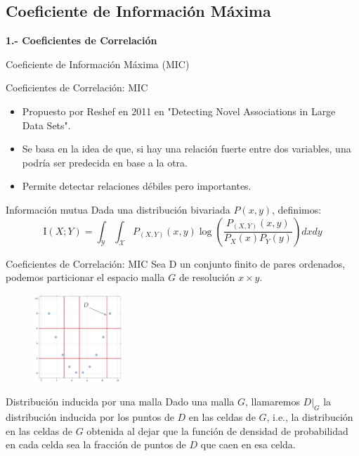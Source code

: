 \documentclass{beamer}
\begin{document}
\subsection{Coeficiente de Información Máxima}
\begin{frame}
    \begin{center}
        {\LARGE\bf 1.- Coeficientes de Correlación}
        \pause

        {\Large  Coeficiente de Información Máxima (MIC)}
    \end{center}
\end{frame}




\begin{frame}{Coeficientes de Correlación: MIC}
    \begin{itemize}
        \item Propuesto por Reshef en 2011 en "Detecting Novel Associations in Large Data Sets".
        \pause
        \item Se basa en la idea de que, si hay una relación fuerte entre dos variables, una podría ser predecida en base a la otra.
        \pause
        \item Permite detectar relaciones débiles pero importantes.
    \end{itemize}
    \pause
    \begin{block}{Información mutua}
    Dada una distribución bivariada $P(x,y)$, definimos:
        \begin{equation*}
            \mathrm{I}(X ; Y)=\int_{\mathcal{Y}} \int_{\mathcal{X}} P_{(X, Y)}(x, y) \log \left(\frac{P_{(X, Y)}(x, y)}{P_{X}(x) P_{Y}(y)}\right)dxdy
        \end{equation*}
    \end{block}
\end{frame}

\begin{frame}{Coeficientes de Correlación: MIC}
    Sea D un conjunto finito de pares ordenados, podemos particionar el espacio malla $G$ de resolución $x \times y$.
    \begin{figure}[H]
        \centering
        \includegraphics[width=0.3\textwidth]{mallaG4x3.png}
    \end{figure}
    \pause
    \begin{block}{Distribución inducida por una malla}
        Dado una malla $G$, llamaremos $D|_G$ la distribuci\'on inducida por los puntos de $D$ en las celdas de $G$, i.e., la distribuci\'on en las celdas de $G$ obtenida al dejar que la funci\'on de densidad de probabilidad en cada celda sea la fracci\'on de puntos de $D$ que caen en esa celda.
    \end{block}
    
\end{frame}
\end{document}
